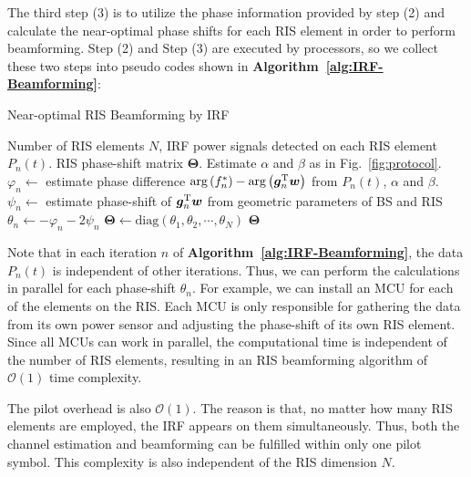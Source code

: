 \documentclass[12pt,draftclsnofoot,journal,onecolumn]{IEEEtran}
\theoremstyle{nonumberplain}
\def \diag {\text{diag}}
\def \arg {\text{arg}}
\begin{document}
    The third step (3) is to utilize the phase information provided by step (2) and calculate the near-optimal phase shifts for each RIS element in order to perform beamforming. 
    Step (2) and Step (3) are executed by processors, so we collect these two steps into pseudo codes shown in {\bf Algorithm~\ref{alg:IRF-Beamforming}}:
    \begin{algorithm}[H] 
        \caption{Near-optimal RIS Beamforming by IRF} \label{alg:IRF-Beamforming}
        \begin{algorithmic}[1]
            \REQUIRE Number of RIS elements $N$, IRF power signals detected on each RIS element $P_n(t)$.
            \ENSURE RIS phase-shift matrix ${\bm \Theta}$.
                \STATE Estimate $\alpha$ and $\beta$ as in Fig.~\ref{fig:protocol}.
                \STATE $\varphi_n \leftarrow$ estimate phase difference  $\arg\left(f_{n}^{*}\right)-\arg\left(\bm g_{n}^{\rm T}\bm w\right)$ from $P_n(t)$, $\alpha$ and $\beta$. 
                \STATE $\psi_{n} \leftarrow$ estimate phase-shift of $\bm g_{n}^{\rm T}\bm w$ from geometric parameters of BS and RIS
                \STATE $\theta_n \leftarrow -\varphi_n - 2\psi_n$
            \ENDFOR
            \STATE ${\bm \Theta} \leftarrow \diag(\theta_1, \theta_2, \cdots, \theta_N)$
            \RETURN ${\bm \Theta}$
        \end{algorithmic}
    \end{algorithm}
    Note that in each iteration $n$ of {\bf Algorithm~\ref{alg:IRF-Beamforming}}, the data $P_n(t)$ is independent of other iterations. Thus, we can perform the calculations in parallel for each phase-shift $\theta_n$. For example, we can install an MCU for each of the elements on the RIS. Each MCU is only responsible for gathering the data from its own power sensor and adjusting the phase-shift of its own RIS element. Since all MCUs can work in parallel, the computational time is independent of the number of RIS elements, resulting in an RIS beamforming algorithm of $\mathcal{O}(1)$ time complexity. 

    The pilot overhead is also $\mathcal{O}(1)$. The reason is that, no matter how many RIS elements are employed, the IRF appears on them simultaneously. Thus, both the channel estimation and beamforming can be fulfilled within only one pilot symbol. This complexity is also independent of the RIS dimension $N$. 
\end{document}
